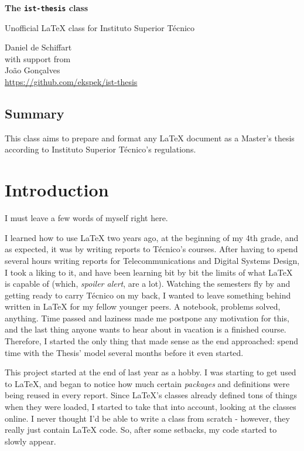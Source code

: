 \documentclass[english]{../ist-thesis}
\begin{document}
\begin{center}
	{\Huge\bfseries The \texttt{ist-thesis} class}
	\par\bigskip
	{\Large Unofficial \LaTeX{} class for Instituto Superior Técnico}
	\par\bigskip\smallskip
	Daniel de Schiffart \\
	{\small with support from} \\
	{João Gonçalves \\}
	\url{https://github.com/ekspek/ist-thesis}
\end{center}

\bigskip\bigskip

\begin{center}
	\section*{Summary}
\end{center}
This class aims to prepare and format any \LaTeX{} document as a Master's thesis according to Instituto Superior Técnico's regulations.

\tableofcontents

\clearpage

\section*{Introduction}

I must leave a few words of myself right here.

I learned how to use \LaTeX{} two years ago, at the beginning of my 4th grade, and as expected, it was by writing reports to Técnico's courses. After having to spend several hours writing reports for Telecommunications and Digital Systems Design, I took a liking to it, and have been learning bit by bit the limits of what \LaTeX{} is capable of (which, \textit{spoiler alert}, are a lot). Watching the semesters fly by and getting ready to carry Técnico on my back, I wanted to leave something behind written in \LaTeX{} for my fellow younger peers. A notebook, problems solved, anything. Time passed and laziness made me postpone any motivation for this, and the last thing anyone wants to hear about in vacation is a finished course. Therefore, I started the only thing that made sense as the end approached: spend time with the Thesis' model several months before it even started.


This project started at the end of last year as a hobby. I was starting to get used to \LaTeX{}, and began to notice how much certain \textit{packages} and  definitions were being reused in every report. Since \LaTeX{}'s classes already defined tons of things when they were loaded, I started to take that into account, looking at the classes online. I never thought I'd be able to write a class from scratch - however, they really just contain \LaTeX{} code. So, after some setbacks, my code started to slowly appear.
\end{document}
